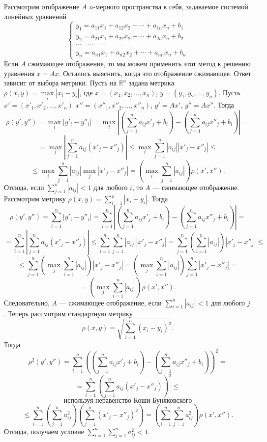 \documentclass[12pt, titlepage, oneside]{amsbook}
\newcommand{\RR}{\mathbb{R}}
\theoremstyle{definition}
\theoremstyle{remark}
\begin{document}
Рассмотрим отображение $A$ $n$-мерного пространства в себя, задаваемое системой линейных уравнений $$\begin{cases} y_1=a_{11}x_1+a_{12}x_2+\cdots+a_{1n}x_n+b_1\\
y_2=a_{21}x_1+a_{22}x_2+\cdots+a_{2n}x_n+b_2\\
\cdots\quad\cdots\quad\cdots\\
y_n=a_{n1}x_1+a_{n2}x_2+\cdots+a_{nn}x_n+b_n\end{cases}$$
Если $A$ сжимающее отображение, то мы можем применить этот метод к решению уравнения $x=Ax$. Осталось выяснить, когда это отображение сжимающее. Ответ зависит от выбора метрики. Пусть на $\RR^n$ задана метрика $\rho(x,y)=\max\limits_i |x_i-y_i|$, где $x=(x_1,x_2,\ldots,x_n)$, $y=(y_1,y_2,\ldots,y_n)$. Пусть $x'=(x'_1,x'_2,\ldots,x'_n)$ $x''=(x''_1,x''_2,\ldots,x''_n)$, $y'=Ax'$, $y''=Ax''$. Тогда $$\rho(y',y'')=\max\limits_i |y'_i-y''_i|=\max\limits_i \left|\left(\sum\limits_{j=1}^n a_{ij}x'_j+b_i\right)-\left(\sum\limits_{j=1}^n a_{ij}x''_j+b_i\right)\right|=$$ $$=\max\limits_i \left|\sum\limits_{j=1}^n a_{ij}(x'_j-x''_j)\right|\leq\max\limits_i\sum\limits_{j=1}^n|a_{ij}||x'_j-x''_j|\leq$$ $$\leq\max\limits_i\sum\limits_{j=1}^n|a_{ij}|\max\limits_j |x'_j-x''_j|=\left(\max\limits_i\sum\limits_{j=1}^n|a_{ij}|\right)\rho(x',x'').$$ Отсюда, если $\sum\limits_{j=1}^n|a_{ij}|<1$ для любого $i$, то $A$ --- сжимающее отображение. Рассмотрим метрику $\rho(x,y)=\sum\limits_{i=1}^n |x_i-y_i|$. Тогда $$\rho(y',y'')=\sum\limits_{i=1}^n  |y'_i-y''_i|=\sum\limits_{i=1}^n  \left|\left(\sum\limits_{j=1}^n a_{ij}x'_j+b_i\right)-\left(\sum\limits_{j=1}^n a_{ij}x''_j+b_i\right)\right|=$$
$$=\sum\limits_{i=1}^n \left|\sum\limits_{j=1}^n a_{ij}(x'_j-x''_j)\right|\leq\sum\limits_{i=1}^n \sum\limits_{j=1}^n |a_{ij}| |x'_j-x''_j|=\sum\limits_{j=1}^n\left(\sum\limits_{i=1}^n |a_{ij}|\right)|x'_j-x''_j|\leq$$
$$\leq\sum\limits_{j=1}^n\left(\max\limits_j\sum\limits_{i=1}^n |a_{ij}|\right)|x'_j-x''_j|=\left(\max\limits_j\sum\limits_{i=1}^n |a_{ij}|\right)\sum\limits_{j=1}^n|x'_j-x''_j|=$$ $$=\left(\max\limits_j\sum\limits_{i=1}^n |a_{ij}|\right)\rho(x',x'').$$ Следовательно, $A$ --- сжимающее отображение, если $\sum\limits_{i=1}^n|a_{ij}|<1$ для любого $j$.
Теперь рассмотрим стандартную метрику $$\rho(x,y)=\sqrt{\sum\limits_{i=1}^n(x_i-y_i)^2}.$$ Тогда $$\rho^2(y',y'')=\sum\limits_{i=1}^n\left(\left(\sum\limits_{j=1}^n a_{ij}x'_j+b_i\right)-\left(\sum\limits_{j=1}^n a_{ij}x''_j+b_i\right)\right)^2=$$ $$=\sum\limits_{i=1}^n\left(\sum\limits_{j=1}^n a_{ij}(x'_j-x''_j)\right)^2\leq$$ $$\text{ используя неравенство Коши-Буняковского }$$ $$\leq\sum\limits_{i=1}^n\left(\sum\limits_{j=1}^n a^2_{ij}\right)\left(\sum\limits_{j=1}^n (x'_j-x''_j)^2\right)=\left(\sum\limits_{i=1}^n\sum\limits_{j=1}^n a^2_{ij}\right)\rho(x',x'').$$ Отсюда, получаем условие $\sum\limits_{i=1}^n\sum\limits_{j=1}^n a^2_{ij}<1$.
\end{document}
